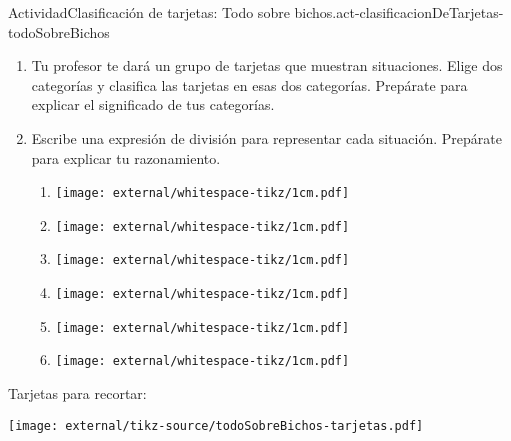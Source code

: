 \documentclass[14pt]{extarticle}
\begin{document}
\begin{activity}{Actividad}{Clasificación de tarjetas: Todo sobre bichos.}{act-clasificacionDeTarjetas-todoSobreBichos}%
%
\begin{enumerate}
\item{}Tu profesor te dará un grupo de tarjetas que muestran situaciones. Elige dos categorías y clasifica las tarjetas en esas dos categorías. Prepárate para explicar el significado de tus categorías.%
\item{}Escribe una expresión de división para representar cada situación. Prepárate para explicar tu razonamiento.%
%
\begin{enumerate}[label={\Alph*.}]
\item{}\begin{image}{0}{1}{0}{}%
\texttt{[image: external/whitespace-tikz/1cm.pdf]}
\end{image}%
%
\item{}\begin{image}{0}{1}{0}{}%
\texttt{[image: external/whitespace-tikz/1cm.pdf]}
\end{image}%
%
\item{}\begin{image}{0}{1}{0}{}%
\texttt{[image: external/whitespace-tikz/1cm.pdf]}
\end{image}%
%
\item{}\begin{image}{0}{1}{0}{}%
\texttt{[image: external/whitespace-tikz/1cm.pdf]}
\end{image}%
%
\item{}\begin{image}{0}{1}{0}{}%
\texttt{[image: external/whitespace-tikz/1cm.pdf]}
\end{image}%
%
\item{}\begin{image}{0}{1}{0}{}%
\texttt{[image: external/whitespace-tikz/1cm.pdf]}
\end{image}%
%
\end{enumerate}
\end{enumerate}
\end{activity}
\clearpage
\fancyhead[L]{}
Tarjetas para recortar:%
\begin{image}{0}{1}{0}{}%
\texttt{[image: external/tikz-source/todoSobreBichos-tarjetas.pdf]}
\end{image}%
\end{document}
